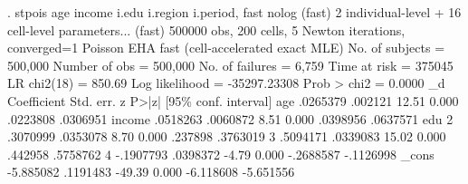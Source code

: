 . stpois age income i.edu i.region i.period, fast nolog
  (fast) 2 individual-level + 16 cell-level parameters...
  (fast) 500000 obs, 200 cells, 5 Newton iterations, converged=1
{\smallskip}
Poisson EHA {\EMDASH} fast (cell-accelerated exact MLE)
{\smallskip}
No. of subjects =      500,000                  Number of obs   =  500,000
No. of failures =        6,759
Time at risk    =       375045                  LR chi2(18)     =   850.69
Log likelihood  = -35297.23308                  Prob > chi2     =   0.0000
{\smallskip}
          _d {\VBAR} Coefficient  Std. err.      z    P>|z|     [95\% conf. interval]
         age {\VBAR}   .0265379    .002121    12.51   0.000     .0223808    .0306951
      income {\VBAR}   .0518263   .0060872     8.51   0.000     .0398956    .0637571
             {\VBAR}
         edu {\VBAR}
          2  {\VBAR}   .3070999   .0353078     8.70   0.000      .237898    .3763019
          3  {\VBAR}   .5094171   .0339083    15.02   0.000      .442958    .5758762
          4  {\VBAR}  -.1907793   .0398372    -4.79   0.000    -.2688587   -.1126998
             {\VBAR}
\oom
       _cons {\VBAR}  -5.885082   .1191483   -49.39   0.000    -6.118608   -5.651556
